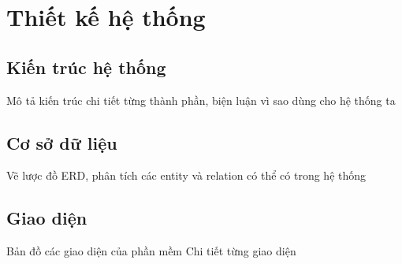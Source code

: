 \section{Thiết kế hệ thống}
\subsection{Kiến trúc hệ thống}
Mô tả kiến trúc chi tiết từng thành phần, biện luận vì sao dùng cho hệ thống ta
\subsection{Cơ sở dữ liệu}
Vẽ lược đồ ERD, phân tích các entity và relation có thể có trong hệ thống
\subsection{Giao diện}
Bản đồ các giao diện của phần mềm
Chi tiết từng giao diện 